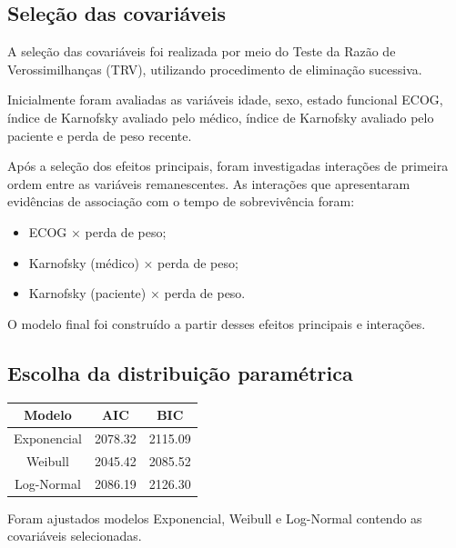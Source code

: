 \documentclass[
  brazilian,
  letterpaper,
  DIV=11,
  numbers=noendperiod]{scrartcl}
\newcounter{none} %
\providecommand{\tightlist}{%
  \setlength{\itemsep}{0pt}\setlength{\parskip}{0pt}}
\begin{document}
\subsection{\texorpdfstring{\textbf{Seleção das
covariáveis}}{Seleção das covariáveis}}\label{seleuxe7uxe3o-das-covariuxe1veis}

A seleção das covariáveis foi realizada por meio do Teste da Razão de
Verossimilhanças (TRV), utilizando procedimento de eliminação sucessiva.

Inicialmente foram avaliadas as variáveis idade, sexo, estado funcional
ECOG, índice de Karnofsky avaliado pelo médico, índice de Karnofsky
avaliado pelo paciente e perda de peso recente.

Após a seleção dos efeitos principais, foram investigadas interações de
primeira ordem entre as variáveis remanescentes. As interações que
apresentaram evidências de associação com o tempo de sobrevivência
foram:

\begin{itemize}
\tightlist
\item
  ECOG × perda de peso;
\item
  Karnofsky (médico) × perda de peso;
\item
  Karnofsky (paciente) × perda de peso.
\end{itemize}

O modelo final foi construído a partir desses efeitos principais e
interações.

\subsection{\texorpdfstring{\textbf{Escolha da distribuição
paramétrica}}{Escolha da distribuição paramétrica}}\label{escolha-da-distribuiuxe7uxe3o-paramuxe9trica}

{\def\LTcaptype{none} %
\begin{longtable}[]{@{}ccc@{}}
\toprule\noalign{}
Modelo & AIC & BIC \\
\midrule\noalign{}
\endhead
\bottomrule\noalign{}
\endlastfoot
Exponencial & 2078.32 & 2115.09 \\
Weibull & 2045.42 & 2085.52 \\
Log-Normal & 2086.19 & 2126.30 \\
\end{longtable}
}

Foram ajustados modelos Exponencial, Weibull e Log-Normal contendo as
covariáveis selecionadas.
\end{document}
